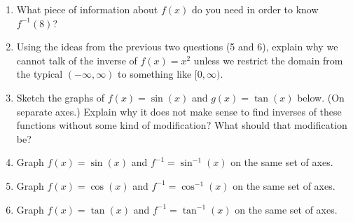 \documentclass[11pt,fleqn]{article}
\begin{document}
\begin{enumerate}
\item What piece of information about $f(x)$ do you need in order to know $f^{-1}(8)$?
\vspace{0.5in}

\item Using the ideas from the previous two questions (5 and 6), explain why we cannot talk of the inverse of $f(x) =x^2$ unless we restrict the domain from the typical $(-\infty,\infty)$ to something like $[0,\infty).$
\vfill

\item Sketch the graphs of $f(x) = \sin (x)$ and $g(x)= \tan (x)$ below. (On separate axes.) Explain why it does not make sense to find inverses of these functions without some kind of modification? What should that modification be?
\vfill
\newpage
\item Graph $f(x)=\sin (x)$ and $f^{-1}= \sin^{-1} (x)$ on the same set of axes.
\vfill
\item Graph $f(x)=\cos (x)$ and $f^{-1}= \cos^{-1} (x)$ on the same set of axes.
\vfill
\item Graph $f(x)=\tan (x)$ and $f^{-1}= \tan^{-1} (x)$ on the same set of axes.
\vfill
\end{enumerate}
\end{document}
